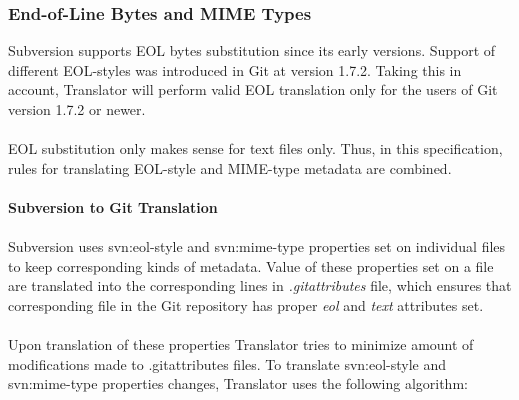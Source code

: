 \subsubsection{End-of-Line Bytes and MIME Types}
Subversion supports EOL bytes substitution since its early versions. 
Support of different EOL-styles was introduced in Git at version 1.7.2. Taking this in account, 
Translator will perform valid EOL translation only for the users of Git version 1.7.2 or newer.
\\\\
EOL substitution only makes sense for text files only. Thus, in this specification, rules 
for translating EOL-style and MIME-type metadata are combined. 
\\\\
\textbf{Subversion to Git Translation}
\\\\
Subversion uses svn:eol-style and svn:mime-type properties set on individual files to keep corresponding kinds of metadata.
Value of these properties set on a file are translated into the corresponding lines in \emph{.gitattributes} file, which ensures that 
corresponding file in the Git repository has proper \emph{eol} and \emph{text} attributes set.
\\\\
Upon translation of these properties Translator tries to minimize amount of modifications
made to .gitattributes files. To translate svn:eol-style and svn:mime-type properties changes, 
Translator uses the following algorithm:

